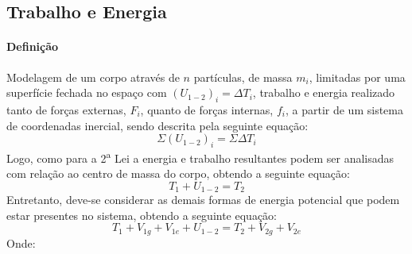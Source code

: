 \documentclass{article}
\begin{document}
        \subsection{Trabalho e Energia}
            \paragraph{Definição}Modelagem de um corpo através de $n$ partículas, de massa $m_{i}$, limitadas por uma superfície fechada no espaço com $(U_{1-2})_{i} = \Delta T_{i}$, trabalho e energia realizado tanto de forças externas, $F_{i}$, quanto de forças internas, $f_{i}$, a partir de um sistema de coordenadas inercial, sendo descrita pela seguinte equação:
                \begin{equation}
                    \Sigma (U_{1-2})_{i} = \Sigma \Delta T_{i}
                \end{equation}
            Logo, como para a 2\textsuperscript{a} Lei a energia e trabalho resultantes podem ser analisadas com relação ao centro de massa do corpo, obtendo a seguinte equação:
                \begin{equation}
                    T_{1} + U_{1-2} = T_{2}
                \end{equation}
            Entretanto, deve-se considerar as demais formas de energia potencial que podem estar presentes no sistema, obtendo a seguinte equação:
                \begin{equation}
                    \boxed{
                        T_{1} + V_{1g} + V_{1e} + U_{1-2} = T_{2} + V_{2g} + V_{2e}
                    }
                \end{equation}
            Onde:
\end{document}
